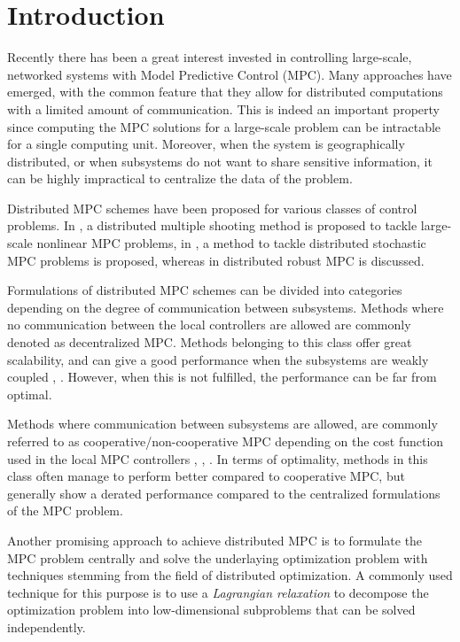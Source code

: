 \section{Introduction}

Recently there has been a great interest invested in controlling large-scale, networked systems with Model Predictive Control (MPC). Many approaches have emerged, with the common feature that they allow for distributed computations with a limited amount of communication. This is indeed an important property since computing the MPC solutions for a large-scale problem can be intractable for a single computing unit. Moreover, when the system is geographically distributed, or when subsystems do not want to share sensitive information, it can be highly impractical to centralize the data of the problem.

Distributed MPC schemes have been proposed for various classes of control problems. In \cite{Kozma2014}, a distributed multiple shooting method is proposed to tackle large-scale nonlinear MPC problems, in \cite{Perizzato2014}, a method to tackle distributed stochastic MPC problems is proposed, whereas in \cite{Conte2013} distributed robust MPC is discussed.

Formulations of distributed MPC schemes can be divided into categories depending on the degree of communication between subsystems. Methods where no communication between the local controllers are allowed are commonly denoted as decentralized MPC. Methods belonging to this class offer great scalability, and can give a good performance when the subsystems are weakly coupled \cite{Alessio2011}, \cite{Magni2006}. However, when this is not fulfilled, the performance can be far from optimal. 

Methods where communication between subsystems are allowed, are commonly referred to as cooperative/non-cooperative MPC depending on the cost function used in the local MPC controllers \cite{Venkat2005}, \cite{Rawlings2008}, \cite{Stewart2010}. In terms of optimality, methods in this class often manage to perform better compared to cooperative MPC, but generally show a derated performance compared to the centralized formulations of the MPC problem.


Another promising approach to achieve distributed MPC is to formulate the MPC problem centrally and solve the underlaying optimization problem with techniques stemming from the field of distributed optimization. A commonly used technique for this purpose is to use a \emph{Lagrangian relaxation} to decompose the optimization problem into low-dimensional subproblems that can be solved independently.

